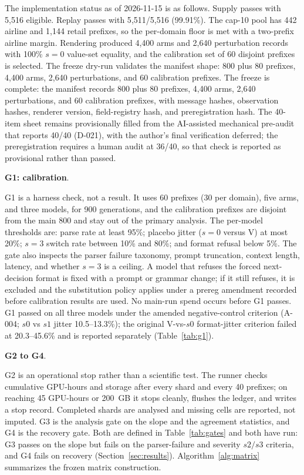 \documentclass[a4paper,fleqn]{cas-sc}
\begin{document}
The implementation status as of 2026-11-15 is as follows. Supply passes with 5{,}516 eligible.
Replay passes with 5{,}511/5{,}516 (99.91\%). The cap-10 pool has 442 airline and 1{,}144 retail
prefixes, so the per-domain floor is met with a two-prefix airline margin. Rendering produced
4{,}400 arms and 2{,}640 perturbation records with 100\% $s=0$ value-set equality, and the
calibration set of 60 disjoint prefixes is selected. The freeze dry-run validates the manifest
shape: 800 plus 80 prefixes, 4{,}400 arms, 2{,}640 perturbations, and 60 calibration prefixes.
The freeze is complete: the manifest records 800 plus 80 prefixes, 4,400 arms, 2,640 perturbations,
and 60 calibration prefixes, with message hashes, observation hashes, renderer version,
field-registry hash, and preregistration hash. The 40-item sheet remains provisionally filled from
the AI-assisted mechanical pre-audit that reports 40/40 (D-021), with the author's final
verification deferred; the preregistration requires a human audit at 36/40, so that check is
reported as provisional rather than passed.

\noindent\textbf{G1: calibration}.\

G1 is a harness check, not a result. It uses 60 prefixes (30 per domain), five arms, and three
models, for 900 generations, and the calibration prefixes are disjoint from the main 800 and stay
out of the primary analysis. The per-model thresholds are: parse rate at least 95\%; placebo
jitter ($s=0$ versus V) at most 20\%; $s=3$ switch rate between 10\% and 80\%; and format refusal
below 5\%. The gate also inspects the parser failure taxonomy, prompt truncation, context length,
latency, and whether $s=3$ is a ceiling. A model that refuses the forced next-decision format is
fixed with a prompt or grammar change; if it still refuses, it is excluded and the substitution
policy applies under a prereg amendment recorded before calibration results are used. No
main-run spend occurs before G1 passes. G1 passed on all three models under the amended
negative-control criterion (A-004; $s0$ vs $s1$ jitter 10.5--13.3\%); the original V-vs-$s0$
format-jitter criterion failed at 20.3--45.6\% and is reported separately (Table~\ref{tab:g1}).

\noindent\textbf{G2 to G4}.\

G2 is an operational stop rather than a scientific test. The runner checks cumulative GPU-hours
and storage after every shard and every 40 prefixes; on reaching 45 GPU-hours or 200~GB it stops
cleanly, flushes the ledger, and writes a stop record. Completed shards are analysed and missing
cells are reported, not imputed. G3 is the analysis gate on the slope and the agreement
statistics, and G4 is the recovery gate. Both are defined in Table~\ref{tab:gates} and both have
run: G3 passes on the slope but fails on the parser-failure and severity $s2/s3$ criteria, and G4
fails on recovery (Section~\ref{sec:results}). Algorithm~\ref{alg:matrix} summarizes the frozen
matrix construction.
\end{document}
